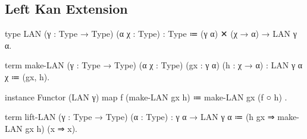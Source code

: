 \subsection{Left Kan Extension}


\begin{program}
type LAN (γ : Type → Type) (α χ : Type) : Type
  ≔ (γ α) ✕ (χ → α) → LAN γ α.

term make-LAN (γ : Type → Type) (α χ : Type)
              (gx : γ α) (h : χ → α)
  : LAN γ α χ
  ≔ (gx, h).

instance Functor (LAN γ)
  { map f (make-LAN gx h) ≔ make-LAN gx (f ○ h) }.

term lift-LAN (γ : Type → Type) (α : Type) : γ α → LAN γ α
  ≔ (h gx ⇒ make-LAN gx h) (x ⇒ x).
\end{program}
